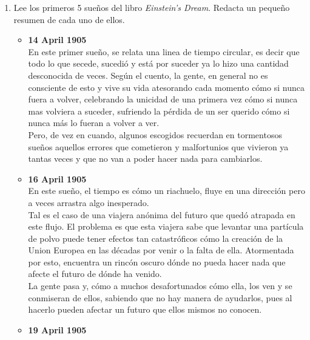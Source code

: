 \documentclass[12pt,a4paper]{report}
\begin{document}
\begin{enumerate}
	\item {
		Lee los primeros 5 sueños del libro \textit{Einstein's Dream}.
		Redacta un pequeño resumen de cada uno de ellos.
        \begin{itemize}
            \item{\textbf{14 April 1905}\\
                En este primer sueño, se relata una linea de tiempo circular,
                es decir que todo lo que secede, sucedió y está por suceder ya
                lo hizo una cantidad desconocida de veces. Según el cuento, la
                gente, en general no es consciente de esto y vive su vida
                atesorando cada momento cómo si nunca fuera a volver, celebrando
                la unicidad de una primera vez cómo si nunca mas volviera a
                suceder, sufriendo la pérdida de un ser querido cómo si nunca
                más lo fueran a volver a ver.\\
                Pero, de vez en cuando, algunos escogidos recuerdan en
                tormentosos sueños aquellos errores que cometieron y
                malfortunios que vivieron ya tantas veces y que no van a poder
                hacer nada para cambiarlos.\\
            }
            \item{\textbf{16 April 1905}\\
                En este sueño, el tiempo es cómo un riachuelo, fluye en una
                dirección pero a veces arrastra algo inesperado.\\
                Tal es el caso de una viajera anónima del futuro que quedó
                atrapada en este flujo. El problema es que esta viajera sabe
                que levantar una partícula de polvo puede tener efectos tan
                catastróficos cómo la creación de la Union Europea en las
                décadas por venir o la falta de ella. Atormentada por esto,
                encuentra un rincón oscuro dónde no pueda hacer nada que afecte
                el futuro de dónde ha venido.\\
                La gente pasa y, cómo a muchos desafortunados cómo ella, los ven
                y se conmiseran de ellos, sabiendo que no hay manera de
                ayudarlos, pues al hacerlo pueden afectar un futuro que ellos
                mismos no conocen.\\
            }
            \item{\textbf{19 April 1905}\\
}
\end{itemize}}
\end{enumerate}
\end{document}
